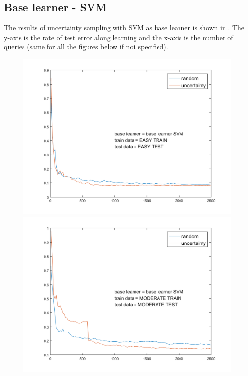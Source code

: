 \documentclass{article}
\begin{document}
\subsection{Base learner - SVM}

The results of uncertainty sampling with SVM as base learner is shown in . The y-axis is the rate of test error along learning and the x-axis is the number of queries (same for all the figures below if not specified).
  \begin{figure}[!ht]
    \begin{minipage}{.31\textwidth}
      \centering
      \includegraphics[width=1\linewidth]{../svm_simple}
    \end{minipage}
    \hfill
    \begin{minipage}{.31\textwidth}
      \centering
      \includegraphics[width=1\linewidth]{../svm_moderate}

\end{minipage}
\end{figure}
\end{document}
